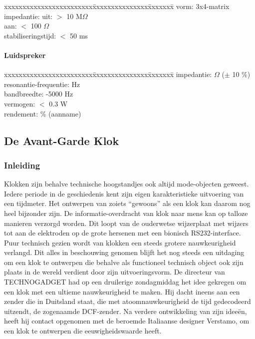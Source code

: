 \begin{tabbing}
xxxxxxxxxxxxxxxxxxxxxxxx\=xxxxxxxxxxxxxxx\=xxxxxxx\=\kill
vorm:			\>3x4-matrix\\
impedantie:		\>uit: 		\>$>$ 10 M$\Omega$\\
			\>aan:		\>$<$ 100 $\Omega$\\
stabiliseringstijd:	\>$<$ 50 ms\\
\end{tabbing}



\paragraph{Luidspreker}

\begin{tabbing}
xxxxxxxxxxxxxxxxxxxxxxxx\=xxxxxxxxxxxxxxx\=xxxxxxx\=\kill
impedantie:		 $\Omega$ ($\pm$ 10 \%)\\
resonantie-frequentie:	 Hz\\
bandbreedte:		-5000 Hz\\
vermogen:		\>$<$ 0.3 W\\
rendement:		 \% (aanname)\\
\end{tabbing}


\subsection{De Avant-Garde Klok}

\subsubsection{Inleiding}
Klokken zijn behalve technische hoogstandjes ook altijd mode-objecten geweest.
Iedere periode in de geschiedenis kent zijn eigen karakteristieke uitvoering van een tijdmeter.
Het ontwerpen van zo\-iets ``gewoons'' als een klok kan daarom nog heel bijzonder zijn.
De informatie-overdracht van klok naar mens kan op talloze manieren verzorgd worden.
Dit loopt van de ouderwetse wijzerplaat met wijzers tot aan de elektroden op de grote hersenen met een bionisch RS232-interface.
Puur technisch gezien wordt van klokken een steeds grotere nauwkeurigheid verlangd.
Dit alles in beschouwing genomen blijft het nog steeds een uitdaging om een klok te ontwerpen die behalve als functio\-neel technisch object ook zijn plaats in de wereld verdient door zijn uitvoeringsvorm.
De directeur van TECHNOGADGET had op een druilerige zondagmiddag het idee
gekregen om een klok met een ultieme nauwkeurigheid te maken. Hij dacht
ineens aan een zender die in Duitsland staat, die met atoomnauwkeurigheid
de tijd gedecodeerd uitzendt, de zogenaamde DCF-zender.
Na verdere ontwikkeling van zijn idee\"en, heeft hij contact opgenomen met
de beroemde Italiaanse designer Verstamo, om
een klok te ontwerpen die eeuwigheidswaarde heeft.

